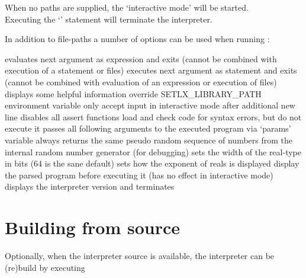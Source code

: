 When no paths are supplied, the `interactive mode' will be started.\\
Executing the `' statement will terminate the interpreter.


In addition to file-paths a number of options can be used when running \setlX{}:

\begin{itemize}
	      {evaluates next argument as expression and exits (cannot be combined with execution of a statement or files)}
	      {executes next argument as statement and exits (cannot be combined with evaluation of an expression or execution of files)}
	      {displays some helpful information}
	      {override SETLX\_LIBRARY\_PATH environment variable}
	      {only accept input in interactive mode after additional new line}
	      {disables all assert functions}
	      {load and check code for syntax errors, but do not execute it}
	      {passes all following arguments to the executed program via `params' variable}
	      {always returns the same pseudo random sequence of numbers from the internal random number generator (for debugging)}
           {sets the width of the real-type in bits (64 is the sane default)}
           {sets how the exponent of reals is displayed}
           {display the parsed program before executing it (has no effect in interactive mode)}
           {displays the interpreter version and terminates}
\end{itemize}

\section{Building from source}

Optionally, when the interpreter source is available, the interpreter can be (re)build by executing

